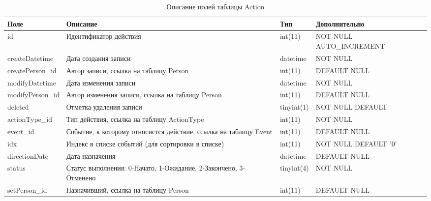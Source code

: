  {\tabulinesep=1.2mm
 \begin{longtabu} to \textwidth {|X[1,c]|X[1,l]|X[c,l]|X[1.5,l]|}
 \caption{Описание полей таблицы Action} \label{db.ActionTable}\\
 \hline
 Поле                   & Описание                                          & Тип           & Дополнительно \\                      \hline
 id                     & Идентификатор действия                            & int(11)       & NOT NULL AUTO\_INCREMENT \\           \hline
 createDatetime         & Дата создания записи                              & datetime      & NOT NULL \\                           \hline
 createPerson\_id       & Автор записи, ссылка на таблицу Person            & int(11)       & DEFAULT NULL \\                       \hline
 modifyDatetime         & Дата изменения записи                             & datetime      & NOT NULL \\                           \hline
 modifyPerson\_id       & Автор изменения записи, ссылка на таблицу Person  & int(11)       & DEFAULT NULL \\                       \hline
 deleted                & Отметка удаления записи                           & tinyint(1)    & NOT NULL DEFAULT \\                   \hline
 actionType\_id         & Тип действия, ссылка на таблицу ActionType        & int(11)       & NOT NULL \\                           \hline
 event\_id              & Событие, к которому относистся действие, ссылка на
                            таблицу Event                                   & int(11)       & DEFAULT NULL \\                       \hline
 idx                    & Индекс в списке событий (для сортировки в списке) & int(11)       & NOT NULL DEFAULT '0' \\               \hline
 directionDate          & Дата назначения                                   & datetime      & DEFAULT NULL \\                       \hline
 status                 & Статус выполнения: 0-Начато, 1-Ожидание,
                            2-Закончено, 3-Отменено                         & tinyint(4)    & NOT NULL \\                           \hline
 setPerson\_id          & Назначивший, ссылка на таблицу Person             & int(11)       & DEFAULT NULL \\                       \hline

\end{longtabu}}
